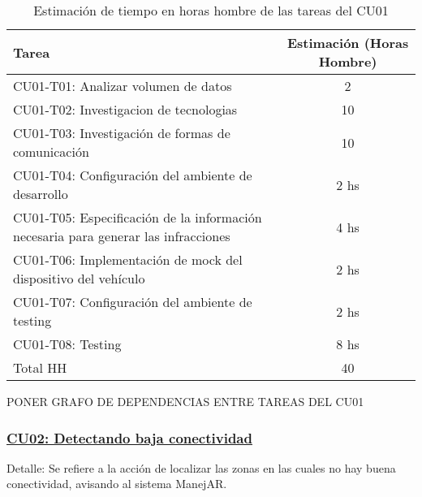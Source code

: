 \begin{table}[htb]
\begin{center}
\begin{tabular}{|l|c|}
\hline
Tarea & Estimación (Horas Hombre) \\
\hline \hline
CU01-T01: Analizar volumen de datos & 2 \\ \hline
CU01-T02: Investigacion de tecnologias & 10 \\ \hline
CU01-T03: Investigación de formas de comunicación & 10 \\ \hline
CU01-T04: Configuración del ambiente de desarrollo & 2 hs \\ \hline
CU01-T05: Especificación de la información necesaria para generar las infracciones & 4 hs \\ \hline
CU01-T06: Implementación de mock del dispositivo del vehículo & 2 hs \\ \hline
CU01-T07: Configuración del ambiente de testing & 2 hs \\ \hline
CU01-T08: Testing & 8 hs \\ \hline
Total HH & 40 \\ \hline
\end{tabular}
\caption{Estimación de tiempo en horas hombre de las tareas del CU01}
\label{tabla:sencilla}
\end{center}
\end{table}


PONER GRAFO DE DEPENDENCIAS ENTRE TAREAS DEL CU01

\subsubsection{\underline{CU02: Detectando baja conectividad}}

Detalle: Se refiere a la acción de localizar las zonas en las cuales no hay buena 
conectividad, avisando al sistema ManejAR.


